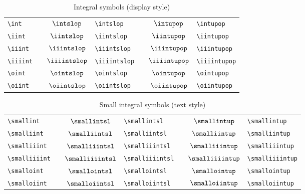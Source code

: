 \documentclass[captions=tableheading]{scrartcl}
\begin{document}
\begin{table}
  \caption{Integral symbols (display style)}
  \label{tab:integrals}
  \centering
  \begin{tabular}[c]{lp{1pt}clp{1pt}cl}
    \toprule
    \verb|\int| & &
    $\displaystyle\intslop$ & \verb|\intslop| & &
    $\displaystyle\intupop$ & \verb|\intupop| \\
    \addlinespace
    \verb|\iint| & &
    $\displaystyle\iintslop$ & \verb|\iintslop| & &
    $\displaystyle\iintupop$ & \verb|\iintupop| \\
    \addlinespace
    \verb|\iiint| & &
    $\displaystyle\iiintslop$ & \verb|\iiintslop| & &
    $\displaystyle\iiintupop$ & \verb|\iiintupop| \\
    \addlinespace
    \verb|\iiiint| & &
    $\displaystyle\iiiintslop$ & \verb|\iiiintslop| & &
    $\displaystyle\iiiintupop$ & \verb|\iiiintupop| \\
    \addlinespace
    \verb|\oint| & &
    $\displaystyle\ointslop$ & \verb|\ointslop| & &
    $\displaystyle\ointupop$ & \verb|\ointupop| \\
    \addlinespace
    \verb|\oiint| & &
    $\displaystyle\oiintslop$ & \verb|\oiintslop| & &
    $\displaystyle\oiintupop$ & \verb|\oiintupop| \\
    \bottomrule
  \end{tabular}
\end{table}

\begin{table}
  \caption{Small integral symbols (text style)}
  \label{tab:small-integrals}
  \centering
  \begin{tabular}[c]{lp{1pt}clp{1pt}cl}
    \toprule
    \verb|\smallint| & &
    $\smallintsl$ & \verb|\smallintsl| & &
    $\smallintup$ & \verb|\smallintup| \\
    \verb|\smalliint| & &
    $\smalliintsl$ & \verb|\smalliintsl| & &
    $\smalliintup$ & \verb|\smalliintup| \\
    \verb|\smalliiint| & &
    $\smalliiintsl$ & \verb|\smalliiintsl| & &
    $\smalliiintup$ & \verb|\smalliiintup| \\
    \verb|\smalliiiint| & &
    $\smalliiiintsl$ & \verb|\smalliiiintsl| & &
    $\smalliiiintup$ & \verb|\smalliiiintup| \\
    \verb|\smalloint| & &
    $\smallointsl$ & \verb|\smallointsl| & &
    $\smallointup$ & \verb|\smallointup| \\
    \verb|\smalloiint| & &
    $\smalloiintsl$ & \verb|\smalloiintsl| & &
    $\smalloiintup$ & \verb|\smalloiintup| \\
    \bottomrule
  \end{tabular}
\end{table}
\end{document}
